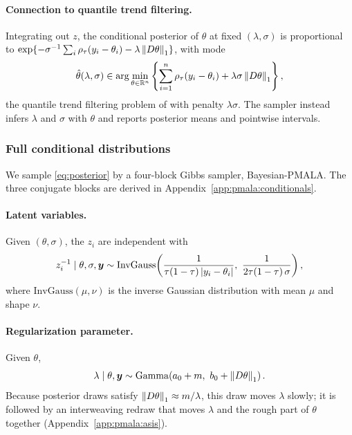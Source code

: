 \paragraph{Connection to quantile trend filtering.} Integrating out $z$, the conditional posterior of $\theta$ at fixed $(\lambda, \sigma)$ is proportional to $\exp\{-\sigma^{-1}\sum_i \rho_\tau(y_i-\theta_i) - \lambda\left\lVert D\theta\right\rVert_1\}$, with mode
\begin{equation}
    \hat{\theta}(\lambda, \sigma) \in \arg\min_{\theta \in \mathbb{R}^n} \left\{ \sum_{i=1}^n \rho_\tau(y_i-\theta_i) + \lambda\sigma \left\lVert D\theta\right\rVert_1 \right\},
    \label{eq:map_qtf}
\end{equation}
the quantile trend filtering problem of \citet{brantley2020baseline} with penalty $\lambda\sigma$. The sampler instead infers $\lambda$ and $\sigma$ with $\theta$ and reports posterior means and pointwise intervals.

\subsubsection{Full conditional distributions}

We sample \eqref{eq:posterior} by a four-block Gibbs sampler, Bayesian-PMALA. The three conjugate blocks are derived in Appendix~\ref{app:pmala:conditionals}.

\paragraph{Latent variables.} Given $(\theta, \sigma)$, the $z_i$ are independent with
\begin{equation}
    z_i^{-1} \mid \theta, \sigma, \bm{y} \sim \mathrm{InvGauss}\!\left(\frac{1}{\tau(1-\tau)\,|y_i - \theta_i|},\ \frac{1}{2\tau(1-\tau)\,\sigma}\right),
    \label{eq:zupdate}
\end{equation}
where $\mathrm{InvGauss}(\mu, \nu)$ is the inverse Gaussian distribution with mean $\mu$ and shape $\nu$.

\paragraph{Regularization parameter.} Given $\theta$,
\begin{equation}
    \lambda \mid \theta, \bm{y} \sim \mathrm{Gamma}\!\left(a_0 + m,\ b_0 + \left\lVert D\theta\right\rVert_1\right).
    \label{eq:lambdaupdate}
\end{equation}
Because posterior draws satisfy $\left\lVert D\theta\right\rVert_1 \approx m/\lambda$, this draw moves $\lambda$ slowly; it is followed by an interweaving redraw \citep{yu2011center} that moves $\lambda$ and the rough part of $\theta$ together (Appendix~\ref{app:pmala:asis}).


